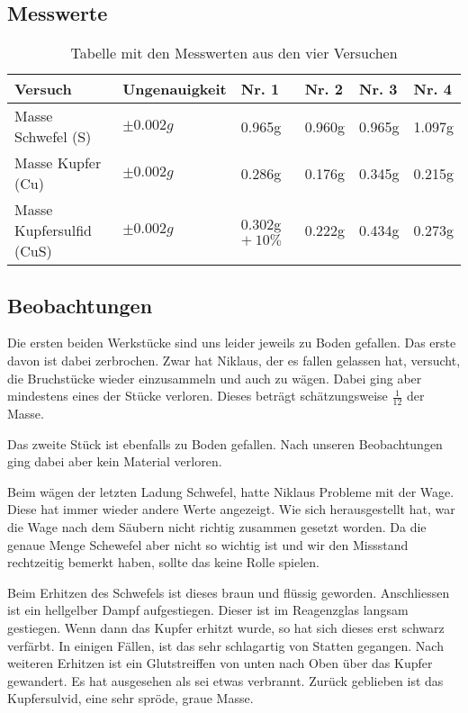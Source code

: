 \documentclass[11pt,paper=a4,final]{scrartcl}
\begin{document}
\subsection{Messwerte}
{
\begin{table}[h!]
\centering
  \begin{tabular}{|l|l|l|l|l|l|}
    \hline
    \bf Versuch			& \bf Ungenauigkeit	& \bf Nr. 1	& \bf Nr. 2	& \bf Nr. 3	& \bf Nr. 4	\\ \hline
    Masse Schwefel (S) 		& \( \pm 0.002g \)	& 0.965g	&	0.960g & 0.965g & 1.097g \\ \hline
    Masse Kupfer (Cu)		& \( \pm 0.002g \)	& 0.286g	&	0.176g & 0.345g & 0.215g \\ \hline
    Masse Kupfersulfid (CuS)	& \( \pm 0.002g \)	& 0.302g \(+ ~ 10\% \)       & 	0.222g & 0.434g & 0.273g \\ \hline
  \end{tabular}
  \caption{Tabelle mit den Messwerten aus den vier Versuchen}
  \label{tab:messwerte}
\end{table}
\subsection{Beobachtungen}
Die ersten beiden Werkst\"ucke sind uns leider jeweils zu Boden gefallen. Das
erste davon ist dabei zerbrochen. Zwar hat Niklaus, der es fallen gelassen hat,
versucht, die Bruchst\"ucke wieder einzusammeln und auch zu w\"agen. Dabei ging
aber mindestens eines der St\"ucke verloren. Dieses betr\"agt sch\"atzungsweise
\( \frac{1}{12} \) der Masse.

Das zweite St\"uck ist ebenfalls zu Boden gefallen. Nach unseren Beobachtungen
ging dabei aber kein Material verloren.

Beim w\"agen der letzten Ladung Schwefel, hatte Niklaus Probleme mit der Wage.
Diese hat immer wieder andere Werte angezeigt. Wie sich herausgestellt hat, war
die Wage nach dem S\"aubern nicht richtig zusammen gesetzt worden. Da die genaue
Menge Schewefel aber nicht so wichtig ist und wir den Missstand rechtzeitig
bemerkt haben, sollte das keine Rolle spielen.

Beim Erhitzen des Schwefels ist dieses braun und fl\"ussig geworden.
Anschliessen ist ein hellgelber Dampf aufgestiegen. Dieser ist im Reagenzglas
langsam gestiegen. Wenn dann das Kupfer erhitzt wurde, so hat sich dieses erst
schwarz verf\"arbt. In einigen F\"allen, ist das sehr schlagartig von Statten
gegangen. Nach weiteren Erhitzen ist ein Glutstreiffen von unten nach
Oben \"uber das Kupfer gewandert. Es hat ausgesehen als sei etwas verbrannt.
Zur\"uck geblieben ist das Kupfersulvid, eine sehr spr\"ode, graue Masse.

}
\end{document}
